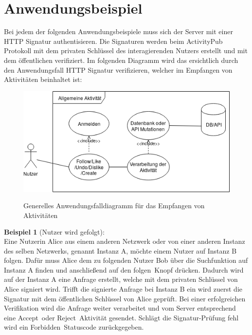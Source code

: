\section{Anwendungsbeispiel}
Bei jedem der folgenden Anwendungsbeispiele muss sich der Server mit einer HTTP Signatur authentisieren. Die Signaturen werden beim ActivityPub Protokoll mit dem privaten Schlüssel des interagierenden Nutzers erstellt und mit dem öffentlichen verifiziert. Im folgenden Diagramm wird das ersichtlich durch den Anwendungsfall \glqq HTTP Signatur verifizieren\grqq, welcher im Empfangen von Aktivitäten beinhaltet ist:\\
\begin{figure}[h]
	\begin{minipage}{\textwidth}
		\centering
		\includegraphics[scale=0.75]{figures/generel-activity-usecase.png}
		\label{fig:generel-activity-usecase}
		\caption{Generelles Anwendungsfalldiagramm für das Empfangen von Aktivitäten}
	\end{minipage}
\end{figure}

\textbf{Beispiel 1} (Nutzer wird gefolgt):\\
Eine Nutzerin Alice aus einem anderen Netzwerk oder von einer anderen Instanz des selben Netzwerks, genannt Instanz A, möchte einem Nutzer auf Instanz B folgen. Dafür muss Alice dem zu folgenden Nutzer Bob über die Suchfunktion auf Instanz A finden und anschließend auf den \glqq folgen\grqq~Knopf drücken. Dadurch wird auf der Instanz A eine Anfrage erstellt, welche mit dem privaten Schlüssel von Alice signiert wird. Trifft die signierte Anfrage bei Instanz B ein wird zuerst die Signatur mit dem öffentlichen Schlüssel von Alice geprüft. Bei einer erfolgreichen Verifikation wird die Anfrage weiter verarbeitet und vom Server entsprechend eine \glqq Accept\grqq~oder \glqq Reject\grqq~Aktivität gesendet. Schlägt die Signatur-Prüfung fehl wird ein \glqq Forbidden\grqq~Statuscode zurückgegeben.\\

